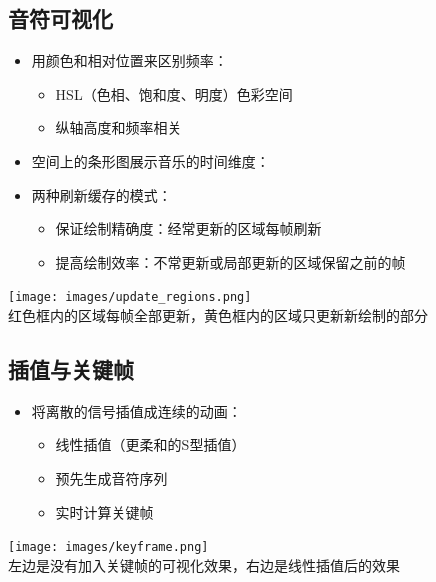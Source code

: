 \documentclass[a4paper, 12pt]{article}
\begin{document}
\subsection{音符可视化}

\begin{itemize}[leftmargin=*]
\item 用颜色和相对位置来区别频率：
    \begin{itemize}[leftmargin=*]
    \item HSL（色相、饱和度、明度）色彩空间
    \item 纵轴高度和频率相关
    \end{itemize}
\item 空间上的条形图展示音乐的时间维度：

\item 两种刷新缓存的模式：
    \begin{itemize}[leftmargin=*]
    \item 保证绘制精确度：经常更新的区域每帧刷新
    \item 提高绘制效率：不常更新或局部更新的区域保留之前的帧
    \end{itemize}
\end{itemize}

\begin{center}
\texttt{[image: images/update\_regions.png]}\\
红色框内的区域每帧全部更新，黄色框内的区域只更新新绘制的部分
\end{center}

\subsection{插值与关键帧}

\begin{itemize}[leftmargin=*]
\item 将离散的信号插值成连续的动画：
    \begin{itemize}[leftmargin=*]
    \item 线性插值（更柔和的S型插值）
    \item 预先生成音符序列
    \item 实时计算关键帧
    \end{itemize}
\end{itemize}

\begin{center}
\texttt{[image: images/keyframe.png]}\\
左边是没有加入关键帧的可视化效果，右边是线性插值后的效果
\end{center}
\end{document}
